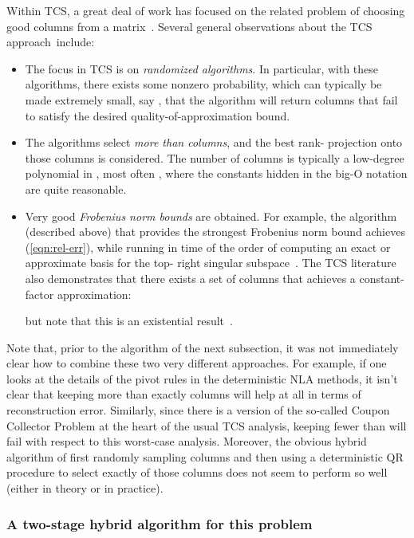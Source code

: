 \documentclass[twoside]{article}
\begin{document}
Within TCS, a great deal of work has focused on the related problem of 
choosing good columns from a 
matrix~\cite{DFKVV04_JRNL,dkm_matrix1,dkm_matrix2,dkm_matrix3,RV07,DMM08_CURtheory_JRNL}.
Several general observations about the TCS approach~include:
\begin{itemize}
\item
The focus in TCS is on \emph{randomized 
algorithms}.
In particular, with these algorithms, there exists some nonzero 
probability, which can typically be made extremely small, say 
, that the algorithm will return columns that fail to 
satisfy the desired quality-of-approximation bound. 
\item
The algorithms select \emph{more than  columns}, and the best 
rank- projection onto those columns is considered.
The number of columns is typically a low-degree polynomial in , most often
, where the constants hidden in the big-O notation are quite 
reasonable.
\item
Very good \emph{Frobenius norm bounds} are obtained. 
For example, the algorithm (described above) that provides the strongest 
Frobenius norm bound achieves
(\ref{eqn:rel-err}),
while running in time of the order of computing an exact or approximate 
basis for the top- right singular subspace~\cite{DMM08_CURtheory_JRNL}.
The TCS literature also demonstrates that there exists a set of  columns 
that achieves a constant-factor approximation:

but note that this is an existential result~\cite{DV06}.
\end{itemize}

Note that, prior to the algorithm of the next subsection, it was not 
immediately clear how to combine these two very different approaches.
For example, if one looks at the details of the pivot rules in the 
deterministic NLA methods, it isn't clear that keeping more than exactly 
 columns will help at all in terms of reconstruction error.
Similarly, since there is a version of the so-called Coupon Collector 
Problem at the heart of the usual TCS analysis, keeping fewer than 
 will fail with respect to this worst-case analysis.
Moreover, the obvious hybrid algorithm of first randomly sampling 
 columns and then using a deterministic QR procedure to select 
exactly  of those columns does not seem to perform so well (either in 
theory or in practice).


\subsubsection{A two-stage hybrid algorithm for this problem}
\end{document}
